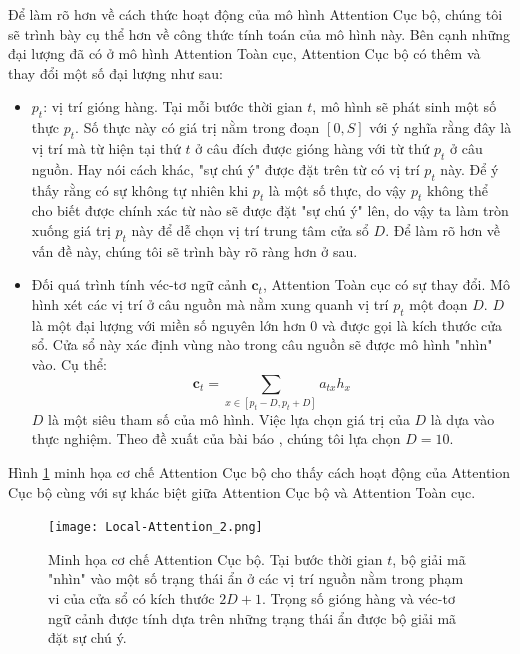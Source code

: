 Để làm rõ hơn về cách thức hoạt động của mô hình Attention Cục bộ, chúng tôi sẽ trình bày cụ thể hơn về công thức tính toán của mô hình này. Bên cạnh những đại lượng đã có ở mô hình Attention Toàn cục, Attention Cục bộ có thêm và thay đổi một số đại lượng như sau:
\begin{itemize}
	\item $p_t$: vị trí gióng hàng. Tại mỗi bước thời gian $t$, mô hình sẽ phát sinh một số thực $p_t$. Số thực này có giá trị nằm trong đoạn $[0, S]$ với ý nghĩa rằng đây là vị trí mà từ hiện tại thứ $t$ ở câu đích được gióng hàng với từ thứ $p_t$ ở câu nguồn. Hay nói cách khác, "sự chú ý" được đặt trên từ có vị trí $p_t$ này. Để ý thấy rằng có sự không tự nhiên khi $p_t$ là một số thực, do vậy $p_t$ không thể cho biết được chính xác từ nào sẽ được đặt "sự chú ý" lên, do vậy ta làm tròn xuống giá trị $p_t$ này để dễ chọn vị trí trung tâm cửa sổ $D$. Để làm rõ hơn về vấn đề này, chúng tôi sẽ trình bày rõ ràng hơn ở sau.
	\item Đối quá trình tính véc-tơ ngữ cảnh $\bm{c}_t$, Attention Toàn cục có sự thay đổi. Mô hình xét các vị trí ở câu nguồn mà nằm xung quanh vị trí $p_t$ một đoạn $D$. $D$ là một đại lượng với miền số nguyên lớn hơn 0 và được gọi là kích thước cửa sổ. Cửa sổ này xác định vùng nào trong câu nguồn sẽ được mô hình "nhìn" vào. Cụ thể:
	\begin{equation}
	\bm{c}_t = \sum_{x \in [p_t - D, p_t + D]} a_{tx} h_x
	\end{equation}
	$D$ là một siêu tham số của mô hình. Việc lựa chọn giá trị của $D$ là dựa vào thực nghiệm. Theo đề xuất của bài báo \cite{attentionThangLuong2015}, chúng tôi lựa chọn $D = 10$.
\end{itemize}

Hình \ref{fig_Local_Attention} minh họa cơ chế Attention Cục bộ cho thấy cách hoạt động của Attention Cục bộ cùng với sự khác biệt giữa Attention Cục bộ và Attention Toàn cục.

\begin{figure}
	\centering
	\texttt{[image: Local-Attention\_2.png]}
	\caption[Minh họa cơ chế Attention Cục bộ.]{Minh họa cơ chế Attention Cục bộ. Tại bước thời gian $t$, bộ giải mã "nhìn" vào một số trạng thái ẩn ở các vị trí nguồn nằm trong phạm vi của cửa sổ có kích thước $2D + 1$. Trọng số gióng hàng và véc-tơ ngữ cảnh được tính dựa trên những trạng thái ẩn được bộ giải mã đặt sự chú ý.}
	\label{fig_Local_Attention}
\end{figure}

